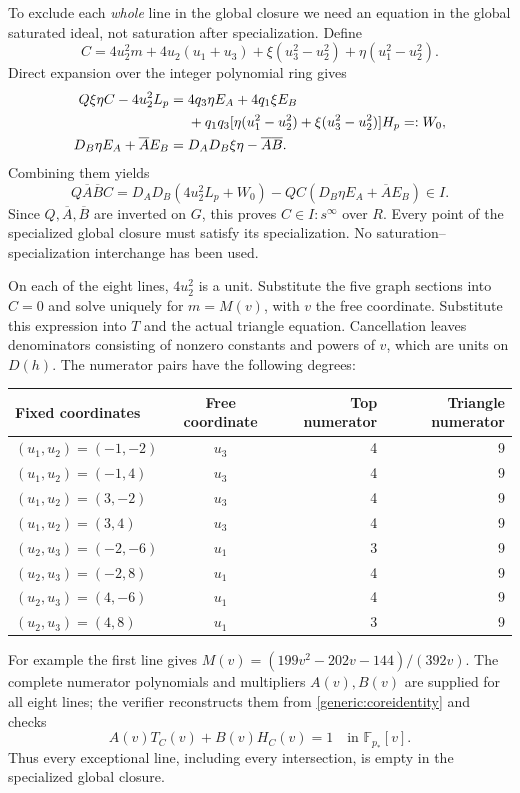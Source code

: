 \documentclass[11pt,a4paper]{article}
\theoremstyle{remark}\newtheorem{remark}[theorem]{Remark}
\newcommand{\Ab}{\overline A}\newcommand{\Bb}{\overline B}
\begin{document}
To exclude each \emph{whole} line in the global closure we need an
equation in the global saturated ideal, not saturation after specialization.
Define
\[
 C=4u_2^2m+4u_2(u_1+u_3)
    +\xi(u_3^2-u_2^2)+\eta(u_1^2-u_2^2).
\]
Direct expansion over the integer polynomial ring gives
\begin{align}
 Q\xi\eta C-4u_2^2L_p
  ={}&4q_3\eta E_A+4q_1\xi E_B\notag\\
   &+q_1q_3[\eta(u_1^2-u_2^2)+\xi(u_3^2-u_2^2)]H_p=:W_0,
   \label{generic:coreidentity}\\
 D_B\eta E_A+\Ab E_B
  ={}&D_AD_B\xi\eta-\Ab\Bb.\label{generic:sectionidentity}
\end{align}
Combining them yields
\[
 Q\Ab\Bb C
 =D_AD_B(4u_2^2L_p+W_0)
   -QC(D_B\eta E_A+\Ab E_B)\in I.
\]
Since $Q,\Ab,\Bb$ are inverted on $G$, this proves $C\in I:s^\infty$
over $R$. Every point of the specialized global closure must satisfy its
specialization. No saturation--specialization interchange has been used.

On each of the eight lines, $4u_2^2$ is a unit. Substitute the five graph
sections into $C=0$ and solve uniquely for $m=M(v)$, with $v$ the free
coordinate. Substitute this expression into $T$ and the actual triangle
equation. Cancellation leaves denominators consisting of nonzero constants
and powers of $v$, which are units on $D(h)$. The numerator pairs have
the following degrees:
\begin{center}\small
\begin{tabular}{@{}lcrr@{}}\toprule
Fixed coordinates & Free coordinate & Top numerator & Triangle numerator\\\midrule
$(u_1,u_2)=(-1,-2)$&$u_3$&4&9\\
$(u_1,u_2)=(-1,4)$&$u_3$&4&9\\
$(u_1,u_2)=(3,-2)$&$u_3$&4&9\\
$(u_1,u_2)=(3,4)$&$u_3$&4&9\\
$(u_2,u_3)=(-2,-6)$&$u_1$&3&9\\
$(u_2,u_3)=(-2,8)$&$u_1$&4&9\\
$(u_2,u_3)=(4,-6)$&$u_1$&4&9\\
$(u_2,u_3)=(4,8)$&$u_1$&3&9\\
\bottomrule\end{tabular}
\end{center}
For example the first line gives
$M(v)=(199v^2-202v-144)/(392v)$. The complete numerator polynomials
and multipliers $A(v),B(v)$ are supplied for all eight lines; the verifier
reconstructs them from \eqref{generic:coreidentity} and checks
\[
 A(v)T_C(v)+B(v)H_C(v)=1
 \quad\text{in }\mathbb F_{p_*}[v].
\]
Thus every exceptional line, including every intersection, is empty in
the specialized global closure.
\end{document}
